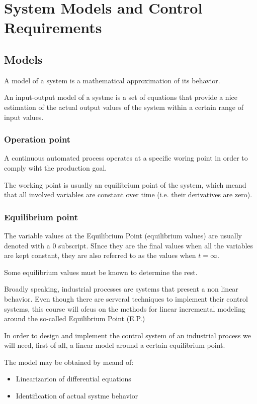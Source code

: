 \chapter{System Models and Control Requirements}
\section{Models}
A model of a system is a mathematical approximation of its behavior.

An input-output model of a systme is a set of equations that provide a nice estimation of the actual output values of the system within a certain range of input values.

\subsection{Operation point}
A continuous automated process operates at a specific woring point in order to comply wiht the production goal.

The working point is usually an equilibrium point of the system, which meand that all involved variables are constant over time (i.e. their derivatives are zero).

\subsection{Equilibrium point}
The variable values at the Equilibrium Point (equilibrium values) are usually denoted with a 0 subscript. SInce they are the final values when all the variables are kept constant, they are also referred to as the values when $t = \infty$.

Some equilibrium values must be known to determine the rest.


Broadly speaking, industrial processes are systems that present a non linear behavior. Even though there are serveral techniques to implement their control systems, this course will ofcus on the methods for linear incremental modeling around the so-called Equilibrium Point (E.P.)

In order to design and implement the control system of an industrial process we will need, first of all, a linear model around a certain equilibrium point.

The model may be obtained by meand of:
\begin{itemize}
    \item Linearizarion of differential equations
    \item Identification of actual systme behavior
\end{itemize}

